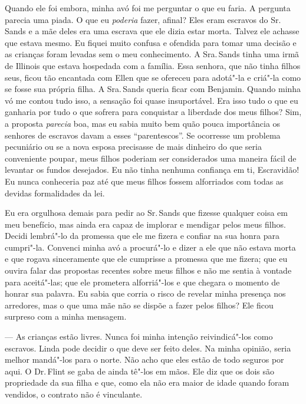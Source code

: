 Quando ele foi embora, minha avó foi me
perguntar o que eu faria. A pergunta parecia uma piada. O que eu
\emph{poderia} fazer, afinal? Eles eram escravos do Sr.\,Sands e a mãe
deles era uma escrava que ele dizia estar morta. Talvez ele achasse que
estava mesmo. Eu fiquei muito confusa e ofendida para tomar uma decisão
e as crianças foram levadas sem o meu conhecimento. A Sra.\,Sands tinha
uma irmã de Illinois que estava hospedada com a família. Essa senhora,
que não tinha filhos seus, ficou tão encantada com Ellen que se ofereceu
para adotá"-la e criá"-la como se fosse sua própria filha. A Sra.\,Sands
queria ficar com Benjamin. Quando minha vó me contou tudo isso, a
sensação foi quase insuportável. Era isso tudo o que eu ganharia por
tudo o que sofrera para conquistar a liberdade dos meus filhos? Sim, a
proposta \emph{parecia} boa, mas eu sabia muito bem quão pouca
importância os senhores de escravos davam a esses ``parentescos''. Se
ocorresse um problema pecuniário ou se a nova esposa precisasse de mais
dinheiro do que seria conveniente poupar, meus filhos poderiam ser
considerados uma maneira fácil de levantar os fundos desejados. Eu não
tinha nenhuma confiança em ti, Escravidão! Eu nunca conheceria paz até
que meus filhos fossem alforriados com todas as devidas formalidades da
lei.

Eu era orgulhosa demais para pedir ao
Sr.\,Sands que fizesse qualquer coisa em meu benefício, mas ainda era
capaz de implorar e mendigar pelos meus filhos. Decidi lembrá"-lo da
promessa que ele me fizera e confiar na sua honra para cumpri"-la.
Convenci minha avó a procurá"-lo e dizer a ele que não estava morta e que
rogava sinceramente que ele cumprisse a promessa que me fizera; que eu
ouvira falar das propostas recentes sobre meus filhos e não me sentia à
vontade para aceitá"-las; que ele prometera alforriá"-los e que chegara o
momento de honrar sua palavra. Eu sabia que corria o risco de revelar
minha presença nos arredores, mas o que uma mãe não se dispõe a fazer
pelos filhos? Ele ficou surpreso com a minha mensagem.

--- As crianças estão livres. Nunca foi minha intenção reivindicá"-los
como escravos. Linda pode decidir o que deve ser feito deles. Na minha
opinião, seria melhor mandá"-los para o norte. Não acho que eles estão de
todo seguros por aqui. O Dr.\,Flint se gaba de ainda tê"-los em mãos. Ele
diz que os dois são propriedade da sua filha e que, como ela não era
maior de idade quando foram vendidos, o contrato não é vinculante.

